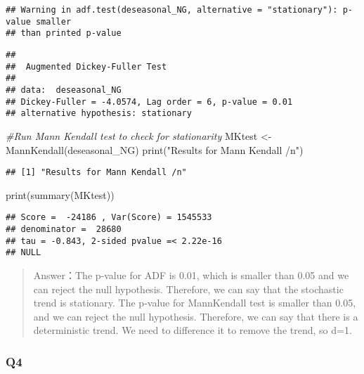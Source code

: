 \documentclass[
]{article}
\newenvironment{Shaded}{\begin{snugshade}}{\end{snugshade}}
\newcommand{\CommentTok}[1]{\textcolor[rgb]{0.56,0.35,0.01}{\textit{#1}}}
\newcommand{\FunctionTok}[1]{\textcolor[rgb]{0.00,0.00,0.00}{#1}}
\newcommand{\NormalTok}[1]{#1}
\newcommand{\OtherTok}[1]{\textcolor[rgb]{0.56,0.35,0.01}{#1}}
\newcommand{\StringTok}[1]{\textcolor[rgb]{0.31,0.60,0.02}{#1}}
\begin{document}
\begin{verbatim}
## Warning in adf.test(deseasonal_NG, alternative = "stationary"): p-value smaller
## than printed p-value
\end{verbatim}

\begin{verbatim}
## 
##  Augmented Dickey-Fuller Test
## 
## data:  deseasonal_NG
## Dickey-Fuller = -4.0574, Lag order = 6, p-value = 0.01
## alternative hypothesis: stationary
\end{verbatim}

\begin{Shaded}
\begin{Highlighting}[]
\CommentTok{\#Run Mann Kendall test to check for stationarity}
\NormalTok{MKtest }\OtherTok{\textless{}{-}} \FunctionTok{MannKendall}\NormalTok{(deseasonal\_NG)}
\FunctionTok{print}\NormalTok{(}\StringTok{"Results for Mann Kendall /n"}\NormalTok{)}
\end{Highlighting}
\end{Shaded}

\begin{verbatim}
## [1] "Results for Mann Kendall /n"
\end{verbatim}

\begin{Shaded}
\begin{Highlighting}[]
\FunctionTok{print}\NormalTok{(}\FunctionTok{summary}\NormalTok{(MKtest))}
\end{Highlighting}
\end{Shaded}

\begin{verbatim}
## Score =  -24186 , Var(Score) = 1545533
## denominator =  28680
## tau = -0.843, 2-sided pvalue =< 2.22e-16
## NULL
\end{verbatim}

\begin{quote}
Answer：The p-value for ADF is 0.01, which is smaller than 0.05 and we
can reject the null hypothesis. Therefore, we can say that the
stochastic trend is stationary. The p-value for MannKendall test is
smaller than 0.05, and we can reject the null hypothesis. Therefore, we
can say that there is a deterministic trend. We need to difference it to
remove the trend, so d=1.
\end{quote}

\hypertarget{q4}{%
\subsubsection{Q4}\label{q4}}
\end{document}
